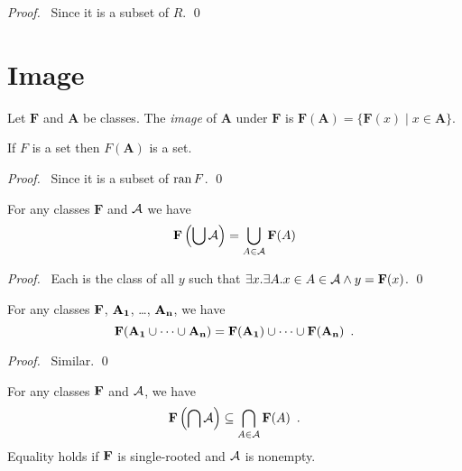 \begin{proof}
    \pf\ Since it is a subset of $R$. \qed
\end{proof}

\section{Image}

\begin{definition}
    Let $\mathbf{F}$ and $\mathbf{A}$ be classes. The \emph{image} of $\mathbf{A}$
    under $\mathbf{F}$ is $\mathbf{F}(\mathbf{A}) = \{ \mathbf{F}(x) \mid x \in \mathbf{A} \}$.
\end{definition}

\begin{theorem}
    If $F$ is a set then $F(\mathbf{A})$ is a set.
\end{theorem}

\begin{proof}
    \pf\ Since it is a subset of $\ran F$. \qed
\end{proof}

\begin{theorem}[Pairing]
    For any classes $\mathbf{F}$ and $\mathbf{\AA}$ we have
    \[ \mathbf{F} \left( \bigcup \mathbf{\AA} \right) = \bigcup_{A \in \mathbf{\AA}} \mathbf{F}(A) \]
\end{theorem}

\begin{proof}
    \pf\ Each is the class of all $y$ such that $\exists x. \exists A.
    x \in A \in \mathbf{\AA} \wedge y = \mathbf{F}(x)$. \qed
\end{proof}

\begin{theorem}[Pairing]
    For any classes $\mb{F}$, $\mb{A_1}$, \ldots, $\mb{A_n}$, we have
    \[ \mb{F}(\mb{A_1} \cup \cdots \cup \mb{A_n}) = \mb{F}(\mb{A_1}) \cup \cdots \cup \mb{F}(\mb{A_n}) \enspace . \]
\end{theorem}

\begin{proof}
    \pf\ Similar. \qed
\end{proof}

\begin{theorem}[Pairing]
    For any classes $\mb{F}$ and $\mb{\AA}$, we have
    \[ \mb{F} \left( \bigcap \mb{\AA} \right) \subseteq \bigcap_{A \in \mb{\AA}} \mb{F}(A) \enspace . \]
    Equality holds if $\mb{F}$ is single-rooted and $\mb{\AA}$ is nonempty.
\end{theorem}

